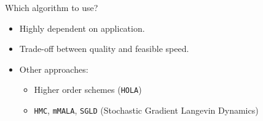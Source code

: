\documentclass[aspectratio=169]{beamer}
\begin{document}
    

\begin{frame}{Which algorithm to use?}
    \begin{itemize}
        \item Highly dependent on application.
        \item Trade-off between quality and feasible speed.
        \item Other approaches:
        \begin{itemize}
            \item Higher order schemes (\texttt{HOLA})
            \item \texttt{HMC}, \texttt{mMALA}, \texttt{SGLD} (Stochastic Gradient Langevin Dynamics)
        \end{itemize}
    \end{itemize}

    \end{frame}

\end{document}
